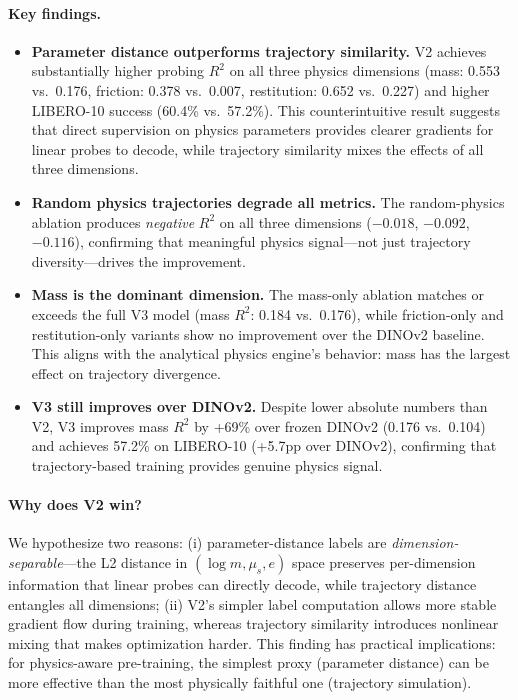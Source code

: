\documentclass{article}
\begin{document}
\paragraph{Key findings.}
\begin{itemize}[leftmargin=*,itemsep=0pt,topsep=2pt]
    \item \textbf{Parameter distance outperforms trajectory similarity.} V2 achieves substantially higher probing $R^2$ on all three physics dimensions (mass: 0.553 vs.\ 0.176, friction: 0.378 vs.\ 0.007, restitution: 0.652 vs.\ 0.227) and higher LIBERO-10 success (60.4\% vs.\ 57.2\%). This counterintuitive result suggests that direct supervision on physics parameters provides clearer gradients for linear probes to decode, while trajectory similarity mixes the effects of all three dimensions.
    \item \textbf{Random physics trajectories degrade all metrics.} The random-physics ablation produces \emph{negative} $R^2$ on all three dimensions ($-0.018$, $-0.092$, $-0.116$), confirming that meaningful physics signal---not just trajectory diversity---drives the improvement.
    \item \textbf{Mass is the dominant dimension.} The mass-only ablation matches or exceeds the full V3 model (mass $R^2$: 0.184 vs.\ 0.176), while friction-only and restitution-only variants show no improvement over the DINOv2 baseline. This aligns with the analytical physics engine's behavior: mass has the largest effect on trajectory divergence.
    \item \textbf{V3 still improves over DINOv2.} Despite lower absolute numbers than V2, V3 improves mass $R^2$ by +69\% over frozen DINOv2 (0.176 vs.\ 0.104) and achieves 57.2\% on LIBERO-10 (+5.7pp over DINOv2), confirming that trajectory-based training provides genuine physics signal.
\end{itemize}

\paragraph{Why does V2 win?} We hypothesize two reasons: (i) parameter-distance labels are \emph{dimension-separable}---the L2 distance in $(\log m, \mu_s, e)$ space preserves per-dimension information that linear probes can directly decode, while trajectory distance entangles all dimensions; (ii) V2's simpler label computation allows more stable gradient flow during training, whereas trajectory similarity introduces nonlinear mixing that makes optimization harder. This finding has practical implications: for physics-aware pre-training, the simplest proxy (parameter distance) can be more effective than the most physically faithful one (trajectory simulation).
\end{document}
